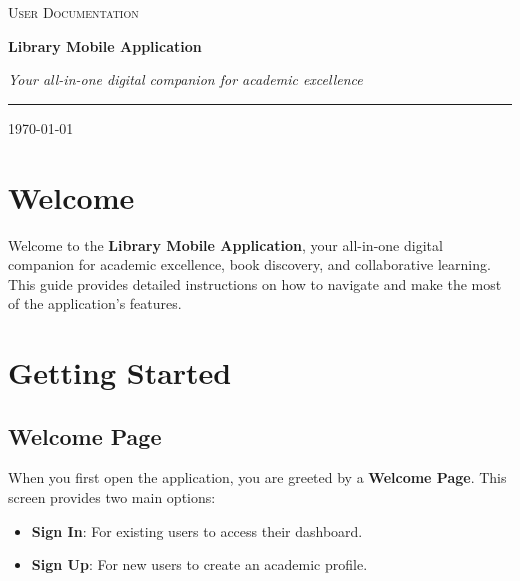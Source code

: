 \documentclass[12pt,a4paper]{article}
\begin{document}
\begin{titlepage}
    \centering
    \vspace*{2cm}
    
    {\scshape\LARGE User Documentation \par}
    \vspace{1cm}
    {\Huge\bfseries\color{LibraryBlue} Library Mobile Application \par}
    \vspace{0.5cm}
    {\large\itshape Your all-in-one digital companion for academic excellence \par}
    
    \vspace{2cm}
    \rule{0.8\textwidth}{1pt}
    \vspace{2cm}
    
    \vfill
    
    {\large \today \par}
\end{titlepage}

\tableofcontents
\newpage

\section*{Welcome}

Welcome to the \textbf{Library Mobile Application}, your all-in-one digital companion for academic excellence, book discovery, and collaborative learning. This guide provides detailed instructions on how to navigate and make the most of the application's features.

\section{Getting Started}

\subsection{Welcome Page}
When you first open the application, you are greeted by a \textbf{Welcome Page}. This screen provides two main options:
\begin{itemize}
    \item \textbf{Sign In}: For existing users to access their dashboard.
    \item \textbf{Sign Up}: For new users to create an academic profile.
\end{itemize}
\end{document}
